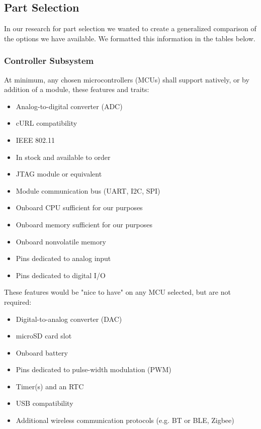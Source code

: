 \subsection{Part Selection}
In our research for part selection we wanted to create a generalized comparison of the options we have available. We formatted this information in the tables below.
\subsubsection{Controller Subsystem}
At minimum, any chosen microcontrollers (MCUs) shall support natively, or by addition of a
module, these features and traits:
\begin{itemize}
	\item Analog-to-digital converter (ADC)
	\item cURL compatibility
	\item IEEE 802.11
	\item In stock and available to order
	\item JTAG module or equivalent
	\item Module communication bus (UART, I2C, SPI)
	\item Onboard CPU sufficient for our purposes
	\item Onboard memory sufficient for our purposes
	\item Onboard nonvolatile memory
	\item Pins dedicated to analog input
	\item Pins dedicated to digital I/O
\end{itemize}
These features would be "nice to have" on any MCU selected, but are not required:
\begin{itemize}
	\item Digital-to-analog converter (DAC)
	\item microSD card slot
	\item Onboard battery
	\item Pins dedicated to pulse-width modulation (PWM)
	\item Timer(s) and an RTC
	\item USB compatibility
	\item Additional wireless communication protocols (e.g. BT or BLE, Zigbee)
\end{itemize}

